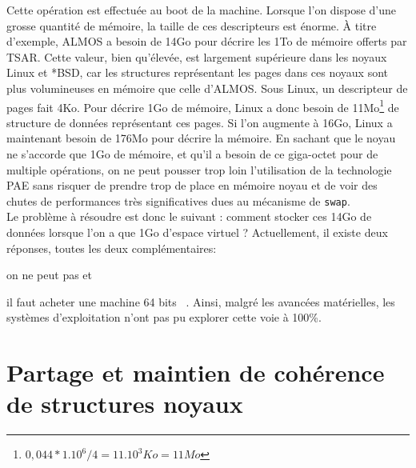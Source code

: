       Cette opération est effectuée au boot de la machine. Lorsque l’on dispose
      d’une grosse quantité de mémoire, la taille de ces descripteurs est
      énorme. À titre d’exemple, ALMOS a besoin de 14Go pour décrire les 1To de
      mémoire offerts par TSAR. Cette valeur, bien qu’élevée, est largement
      supérieure dans les noyaux Linux et *BSD, car les structures représentant
      les pages dans ces noyaux sont plus volumineuses en mémoire que celle
      d’ALMOS. Sous Linux, un descripteur de pages fait 4Ko. Pour décrire 1Go de
      mémoire, Linux a donc besoin de 11Mo\footnote{$0,044*1.10^6/4 = 11.10^3Ko
        = 11Mo$} de structure de données représentant ces pages. Si l'on
      augmente à 16Go, Linux a maintenant besoin de 176Mo pour décrire la
      mémoire. En sachant que le noyau ne s'accorde que 1Go de mémoire, et qu'il
      a besoin de ce giga-octet pour de multiple opérations, on ne peut pousser
      trop loin l'utilisation de la technologie PAE sans risquer de prendre trop
      de place en mémoire noyau et de voir des chutes de performances très
      significatives dues au mécanisme de \texttt{swap}.\\

      Le problème à résoudre est donc le suivant : comment stocker ces 14Go de
      données lorsque l’on a que 1Go d’espace virtuel ?  Actuellement, il existe
      deux réponses, toutes les deux complémentaires: \benumline \item on ne
      peut pas et \item il faut acheter une machine 64
      bits~\citep{gorman2004understanding} \eenumline. Ainsi, malgré les
      avancées matérielles, les systèmes d'exploitation n'ont pas pu explorer
      cette voie à 100\%.


  \section{Partage et maintien de cohérence de structures noyaux}
  \label{sec:consistency}
  




